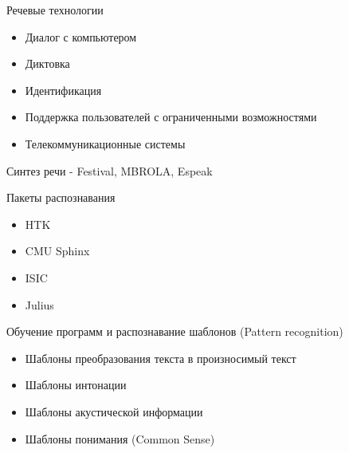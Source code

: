 \documentclass{seminar}
\begin{document}
\sffamily

\begin{slide}


\end{slide}

\begin{slide}

Речевые технологии

\begin{itemize}
\item Диалог с компьютером
\item Диктовка
\item Идентификация
\item Поддержка пользователей с ограниченными возможностями
\item Телекоммуникационные системы
\end{itemize}

\end{slide}

\begin{slide}

Синтез речи - Festival, MBROLA, Espeak

\end{slide}

\begin{slide}
Пакеты распознавания

\begin{itemize}
\item HTK
\item CMU Sphinx
\item ISIC
\item Julius
\end{itemize}

\end{slide}

\begin{slide}

Обучение программ и распознавание шаблонов (Pattern recognition)

\begin{itemize}
\item Шаблоны преобразования текста в произносимый текст
\item Шаблоны интонации
\item Шаблоны акустической информации
\item Шаблоны понимания (Common Sense)
\end{itemize}

\end{slide}
\end{document}
